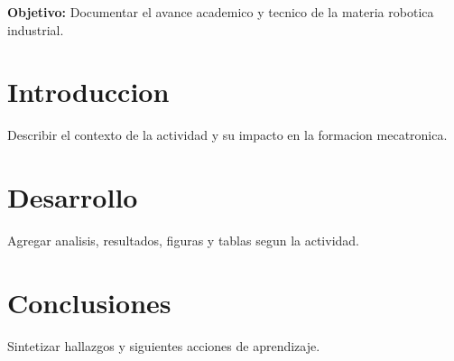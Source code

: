 \documentclass[spanish,letterpaper,oneside]{article}
\begin{document}
\templatePortrait
\templatePagecfg
\onehalfspacing

\begin{abstractd}
\textbf{Objetivo:} Documentar el avance academico y tecnico de la materia robotica industrial.
\end{abstractd}

\templateIndex
\templateFinalcfg

\section{Introduccion}
Describir el contexto de la actividad y su impacto en la formacion mecatronica.

\section{Desarrollo}
Agregar analisis, resultados, figuras y tablas segun la actividad.

\section{Conclusiones}
Sintetizar hallazgos y siguientes acciones de aprendizaje.



\end{document}
